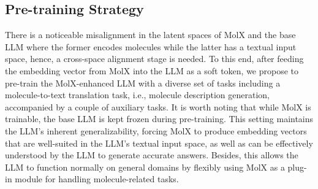 \subsection{Pre-training Strategy}
There is a noticeable misalignment in the latent spaces of MolX and the base LLM where the former encodes molecules while the latter has a textual input space, hence, a cross-space alignment stage is needed. To this end, after feeding the embedding vector from MolX into the LLM as a soft token, we propose to pre-train the MolX-enhanced LLM with a diverse set of tasks including a molecule-to-text translation task, i.e., molecule description generation, accompanied by a couple of auxiliary tasks. It is worth noting that while MolX is trainable, the base LLM is kept frozen during pre-training. This setting maintains the LLM’s inherent generalizability, forcing MolX to produce embedding vectors that are well-suited in the LLM’s textual input space, as well as can be effectively understood by the LLM to generate accurate answers. Besides, this allows the LLM to function normally on general domains by flexibly using MolX as a plug-in module for handling molecule-related tasks. 

